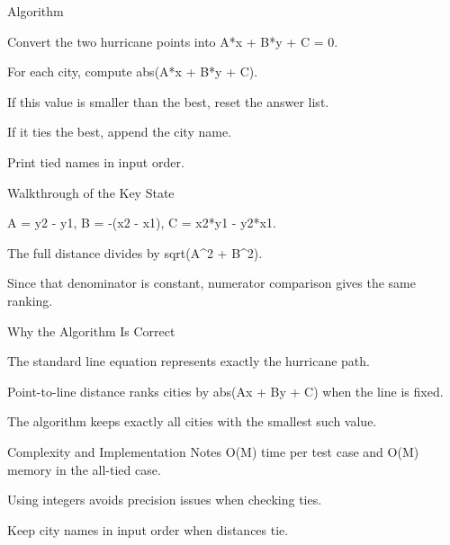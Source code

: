 \documentclass[aspectratio=169,11pt]{beamer}
\begin{document}
\begin{frame}{Algorithm}
\begin{tightitemize}
  \item Convert the two hurricane points into A*x + B*y + C = 0.
  \item For each city, compute abs(A*x + B*y + C).
  \item If this value is smaller than the best, reset the answer list.
  \item If it ties the best, append the city name.
  \item Print tied names in input order.
\end{tightitemize}
\end{frame}

\begin{frame}{Walkthrough of the Key State}
\begin{tightitemize}
  \item A = y2 - y1, B = -(x2 - x1), C = x2*y1 - y2*x1.
  \item The full distance divides by sqrt(A\textasciicircum{}2 + B\textasciicircum{}2).
  \item Since that denominator is constant, numerator comparison gives the same ranking.
\end{tightitemize}
\end{frame}

\begin{frame}{Why the Algorithm Is Correct}
\begin{tightitemize}
  \item The standard line equation represents exactly the hurricane path.
  \item Point-to-line distance ranks cities by abs(Ax + By + C) when the line is fixed.
  \item The algorithm keeps exactly all cities with the smallest such value.
\end{tightitemize}
\end{frame}

\begin{frame}{Complexity and Implementation Notes}
\small
{} O(M) time per test case and O(M) memory in the all-tied case.

\vspace{0.3cm}
\begin{tightitemize}
  \item Using integers avoids precision issues when checking ties.
  \item Keep city names in input order when distances tie.
\end{tightitemize}
\end{frame}
\end{document}
